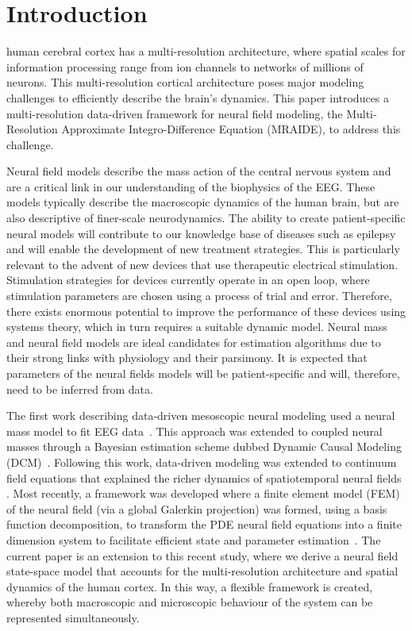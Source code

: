 \documentclass[journal]{IEEEtran}
\begin{document}
\section{Introduction}
 human cerebral cortex has a multi-resolution architecture, where spatial scales for information processing range from ion channels to networks of millions of neurons. This multi-resolution cortical architecture poses major modeling challenges to efficiently describe the brain's dynamics. This paper introduces a multi-resolution data-driven framework for neural field modeling, the Multi-Resolution Approximate Integro-Difference Equation (MRAIDE), to address this challenge. 

Neural field models describe the mass action of the central nervous system and are a critical link in our understanding of the biophysics of the EEG. These models typically describe the macroscopic dynamics of the human brain, but are also descriptive of finer-scale neurodynamics. The ability to create patient-specific neural models will contribute to our knowledge base of diseases such as epilepsy and will enable the development of new treatment strategies. This is particularly relevant to the advent of new devices that use therapeutic electrical stimulation. Stimulation strategies for devices currently operate in an open loop, where stimulation parameters are chosen using a process of trial and error. Therefore, there exists enormous potential to improve the performance of these devices using systems theory, which in turn requires a suitable dynamic model. Neural mass and neural field models are ideal candidates for estimation algorithms due to their strong links with physiology and their parsimony. It is expected that parameters of the neural fields models will be patient-specific and will, therefore, need to be inferred from data.

The first work describing data-driven mesoscopic neural modeling used a neural mass model to fit EEG data~\cite{Valdes1999}. This approach was extended to coupled neural masses through a Bayesian estimation scheme dubbed Dynamic Causal Modeling (DCM)~\cite{David2003}. Following this work, data-driven modeling was extended to continuum field equations that explained the richer dynamics of spatiotemporal neural fields \cite{Galka2008,schiff2008kalman,Daunizeau2009}. Most recently, a framework was developed where a finite element model (FEM) of the neural field (via a global Galerkin projection) was formed, using a basis function decomposition, to transform the PDE neural field equations into a finite dimension system to facilitate efficient state and parameter estimation~\cite{Freestone2011}. The current paper is an extension to this recent study, where we derive a neural field state-space model that accounts for the multi-resolution architecture and spatial dynamics of the human cortex. In this way, a flexible framework is created, whereby both macroscopic and microscopic behaviour of the system can be represented simultaneously.
\end{document}

